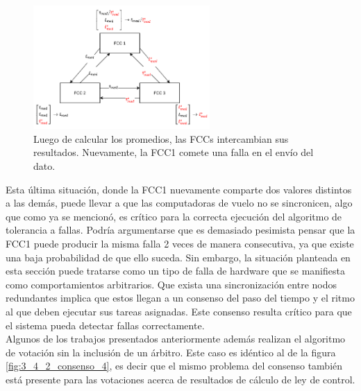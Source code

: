 \begin{figure}[H]
    \centering
    \includegraphics[width=0.6\textwidth]{img/3_4_2_consenso_5.png}
    \caption{Luego de calcular los promedios, las FCCs intercambian sus resultados. Nuevamente, la FCC1 comete una falla en el envío del dato.}
    \label{fig:3_4_2_consenso_5}
\end{figure}

Esta última situación, donde la FCC1 nuevamente comparte dos valores distintos a las demás, puede llevar a que las computadoras de vuelo no se sincronicen, algo que como ya se mencionó, es crítico para la correcta ejecución del algoritmo de tolerancia a fallas. Podría argumentarse que es demasiado pesimista pensar que la FCC1 puede producir la misma falla 2 veces de manera consecutiva, ya que existe una baja probabilidad de que ello suceda. Sin embargo, la situación planteada en esta sección puede tratarse como un tipo de falla de hardware que se manifiesta como comportamientos arbitrarios. Que exista una sincronización entre nodos redundantes implica que estos llegan a un consenso del paso del tiempo y el ritmo al que deben ejecutar sus tareas asignadas. Este consenso resulta crítico para que el sistema pueda detectar fallas correctamente.\\

Algunos de los trabajos presentados anteriormente además realizan el algoritmo de votación sin la inclusión de un árbitro. Este caso es idéntico al de la figura \ref{fig:3_4_2_consenso_4}, es decir que el mismo problema del consenso también está presente para las votaciones acerca de resultados de cálculo de ley de control.\\

